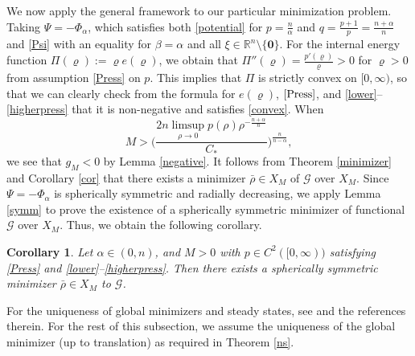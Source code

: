\documentclass[reqno,11pt]{amsart}
\numberwithin{equation}{section}
\newtheorem{corollary}[theorem]{Corollary}
\theoremstyle{definition}
\begin{document}
We now apply the general framework to our particular minimization problem. 
Taking $\Psi = - \Phi_\alpha$, which satisfies both \eqref{potential} 
for $p = \frac{n}{\alpha}$ and $q = \frac{p + 1}{p} = \frac{n + \alpha}{n}$ 
and \eqref{Psi} with an equality for $\beta = \alpha$ 
and all $\xi \in \mathbb{R}^n\setminus \{\boldsymbol{0}\}$. 
For the internal energy function $\Pi(\varrho) := \varrho e(\varrho)$, 
we obtain that
$\Pi''(\varrho) = \frac{p'(\varrho)}{\varrho} > 0$ for $\varrho > 0$ 
from assumption \eqref{Press} on $p$. 
This implies that $\Pi$ is strictly convex on $[0,\infty)$, so that we can clearly check 
from the formula for $e(\varrho)$, $\eqref{Press}$, and \eqref{lower}--\eqref{higherpress} 
that it is non-negative and satisfies \eqref{convex}.
When
\[
 M > \bigg ( \frac{2n \limsup_{\rho \to 0} p(\rho) \rho^{-\frac{n +\alpha}{n}}}{ C_*} \bigg )^\frac{n}{n-\alpha},
\]
we see that $g_M < 0$ by Lemma \ref{negative}. 
It follows from Theorem \ref{minimizer} and Corollary \ref{cor} 
that there exists a minimizer $\bar{\rho} \in X_M$ of $\mathcal{G}$ over $X_M$. 
Since $\Psi = - \Phi_\alpha$ is spherically symmetric and radially decreasing, 
we apply Lemma \ref{symm} to prove the existence of a spherically symmetric minimizer 
of functional $\mathcal{G}$ over $X_M$. Thus, we obtain the following corollary.

\begin{corollary}
Let $\alpha \in (0,n)$, and $M>0$ with $p \in C^2([0,\infty))$ satisfying \eqref{Press} and
\eqref{lower}--\eqref{higherpress}. 
Then there exists a spherically symmetric minimizer $\bar{\rho} \in X_M$ to $\mathcal{G}$.
\end{corollary}

For the uniqueness of global minimizers and steady states, see \cite[Theorem 5.5]{Carrillo2025} and the references therein. For the rest of this subsection, we assume the uniqueness 
of the global minimizer (up to translation) as required in Theorem \ref{ns}.
\end{document}
